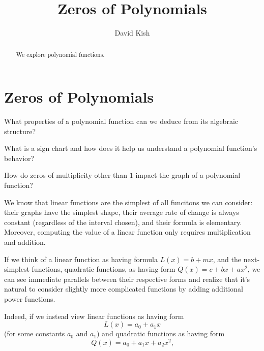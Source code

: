 \documentclass{ximera}
\author{David Kish}
\title{Zeros of Polynomials}
\begin{document}
\begin{abstract}
We explore polynomial functions.
\end{abstract}
\maketitle

%
%
%
\section{Zeros of Polynomials}
\begin{motivatingQuestions}
\item What properties of a polynomial function can we deduce from its algebraic structure?%
\item What is a sign chart and how does it help us understand a polynomial function's behavior?%
\item How do zeros of multiplicity other than $1$ impact the graph of a polynomial function?%
\end{motivatingQuestions}

We know that linear functions are the simplest of all funcitons we can consider:  their graphs have the simplest shape, their average rate of change is always constant (regardless of the interval chosen), and their formula is elementary.  Moreover, computing the value of a linear function only requires multiplication and addition.%

If we think of a linear function as having formula $L(x) = b + mx$, and the next-simplest functions, quadratic functions, as having form $Q(x) = c + bx + ax^2$, we can see immediate parallels between their respective forms and realize that it's natural to consider slightly more complicated functions by adding additional power functions.%

Indeed, if we instead view linear functions as having form%
$$
L(x) = a_0 + a_1 x
$$
(for some constants $a_0$ and $a_1$) and quadratic functions as having form%
$$
Q(x) = a_0 + a_1 x + a_2 x^2\text{,}
$$
\end{document}
